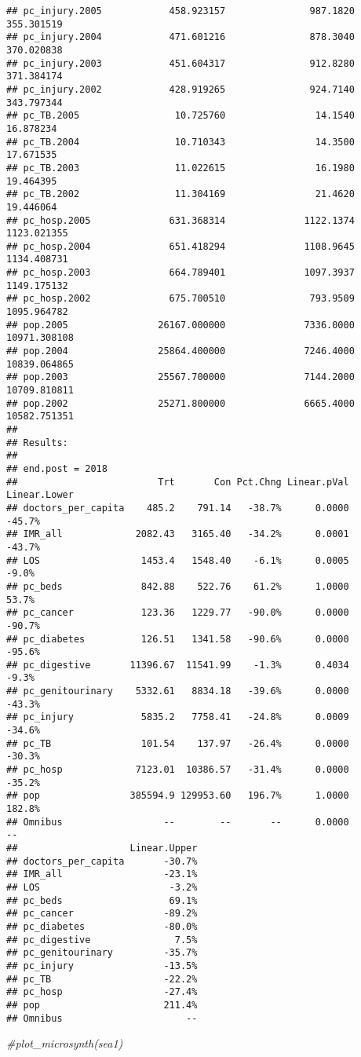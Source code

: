 \documentclass[
]{article}
\newenvironment{Shaded}{\begin{snugshade}}{\end{snugshade}}
\newcommand{\CommentTok}[1]{\textcolor[rgb]{0.56,0.35,0.01}{\textit{#1}}}
\begin{document}
\begin{verbatim}
## pc_injury.2005            458.923157               987.1820   355.301519
## pc_injury.2004            471.601216               878.3040   370.020838
## pc_injury.2003            451.604317               912.8280   371.384174
## pc_injury.2002            428.919265               924.7140   343.797344
## pc_TB.2005                 10.725760                14.1540    16.878234
## pc_TB.2004                 10.710343                14.3500    17.671535
## pc_TB.2003                 11.022615                16.1980    19.464395
## pc_TB.2002                 11.304169                21.4620    19.446064
## pc_hosp.2005              631.368314              1122.1374  1123.021355
## pc_hosp.2004              651.418294              1108.9645  1134.408731
## pc_hosp.2003              664.789401              1097.3937  1149.175132
## pc_hosp.2002              675.700510               793.9509  1095.964782
## pop.2005                26167.000000              7336.0000 10971.308108
## pop.2004                25864.400000              7246.4000 10839.064865
## pop.2003                25567.700000              7144.2000 10709.810811
## pop.2002                25271.800000              6665.4000 10582.751351
## 
## Results: 
## 
## end.post = 2018
##                         Trt       Con Pct.Chng Linear.pVal Linear.Lower
## doctors_per_capita    485.2    791.14   -38.7%      0.0000       -45.7%
## IMR_all             2082.43   3165.40   -34.2%      0.0001       -43.7%
## LOS                  1453.4   1548.40    -6.1%      0.0005        -9.0%
## pc_beds              842.88    522.76    61.2%      1.0000        53.7%
## pc_cancer            123.36   1229.77   -90.0%      0.0000       -90.7%
## pc_diabetes          126.51   1341.58   -90.6%      0.0000       -95.6%
## pc_digestive       11396.67  11541.99    -1.3%      0.4034        -9.3%
## pc_genitourinary    5332.61   8834.18   -39.6%      0.0000       -43.3%
## pc_injury            5835.2   7758.41   -24.8%      0.0009       -34.6%
## pc_TB                101.54    137.97   -26.4%      0.0000       -30.3%
## pc_hosp             7123.01  10386.57   -31.4%      0.0000       -35.2%
## pop                385594.9 129953.60   196.7%      1.0000       182.8%
## Omnibus                  --        --       --      0.0000           --
##                    Linear.Upper
## doctors_per_capita       -30.7%
## IMR_all                  -23.1%
## LOS                       -3.2%
## pc_beds                   69.1%
## pc_cancer                -89.2%
## pc_diabetes              -80.0%
## pc_digestive               7.5%
## pc_genitourinary         -35.7%
## pc_injury                -13.5%
## pc_TB                    -22.2%
## pc_hosp                  -27.4%
## pop                      211.4%
## Omnibus                      --
\end{verbatim}

\begin{Shaded}
\begin{Highlighting}[]
\CommentTok{\#plot\_microsynth(sea1)}
\end{Highlighting}
\end{Shaded}
\end{document}
